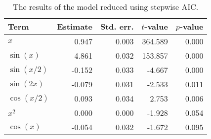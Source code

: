 \begin{table}[!h]

\caption{\label{tab:stepwise-regression}The results of the model reduced using stepwise \ac{AIC}.}
\centering
\begin{tabular}{lrrrr}
\toprule
Term & Estimate & Std. err. & \(t\)-value & \(p\)-value\\
\midrule
\(x\) & 0.947 & 0.003 & 364.589 & 0.000\\
\(\sin(x)\) & 4.861 & 0.032 & 153.857 & 0.000\\
\(\sin(x/2)\) & -0.152 & 0.033 & -4.667 & 0.000\\
\(\sin(2x)\) & -0.079 & 0.031 & -2.533 & 0.011\\
\(\cos(x/2)\) & 0.093 & 0.034 & 2.753 & 0.006\\
\(x^2\) & 0.000 & 0.000 & -1.928 & 0.054\\
\(\cos(x)\) & -0.054 & 0.032 & -1.672 & 0.095\\
\bottomrule
\end{tabular}
\end{table}
